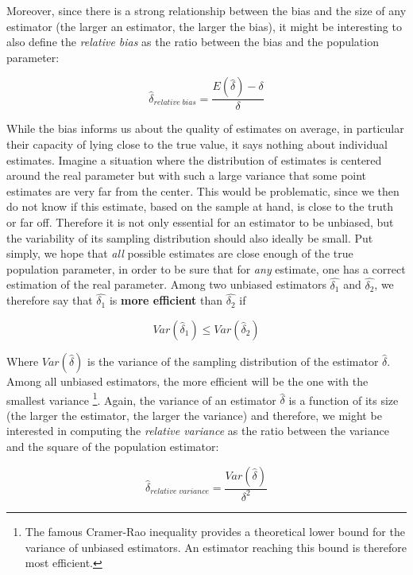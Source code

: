 \documentclass[
  man,floatsintext]{apa6}
\begin{document}
Moreover, since there is a strong relationship between the bias and the size of any estimator (the larger an estimator, the larger the bias), it might be interesting to also define the \emph{relative bias} as the ratio between the bias and the population parameter:

\begin{equation} 
\hat{\delta}_{relative \; bias}=\frac{E(\hat{\delta})-\delta}{\delta}
\label{eq:RELBIAS}
\end{equation}

While the bias informs us about the quality of estimates on average, in particular their capacity of lying close to the true value, it says nothing about individual estimates. Imagine a situation where the distribution of estimates is centered around the real parameter but with such a large variance that some point estimates are very far from the center. This would be problematic, since we then do not know if this estimate, based on the sample at hand, is close to the truth or far off. Therefore it is not only essential for an estimator to be unbiased, but the variability of its sampling distribution should also ideally be small. Put simply, we hope that \emph{all} possible estimates are close enough of the true population parameter, in order to be sure that for \emph{any} estimate, one has a correct estimation of the real parameter. Among two unbiased estimators \(\hat{\delta_1}\) and \(\hat{\delta_2}\), we therefore say that \(\hat{\delta_1}\) is \textbf{more efficient} than \(\hat{\delta_2}\) if

\begin{equation} 
Var(\hat{\delta}_1) \leq Var(\hat{\delta}_2)
\label{eq:EFFICIENCY}
\end{equation}

Where \(Var(\hat{\delta})\) is the variance of the sampling distribution of the estimator \(\hat{\delta}\). Among all unbiased estimators, the more efficient will be the one with the smallest variance \footnote{The famous Cramer-Rao inequality provides a theoretical lower bound for the variance of unbiased estimators. An estimator reaching this bound is therefore most efficient.}. Again, the variance of an estimator \(\hat{\delta}\) is a function of its size (the larger the estimator, the larger the variance) and therefore, we might be interested in computing the \emph{relative variance} as the ratio between the variance and the square of the population estimator:

\begin{equation} 
\hat{\delta}_{relative \; variance}=\frac{Var(\hat{\delta})}{\delta^2}
\label{eq:RELVAR}
\end{equation}
\end{document}
